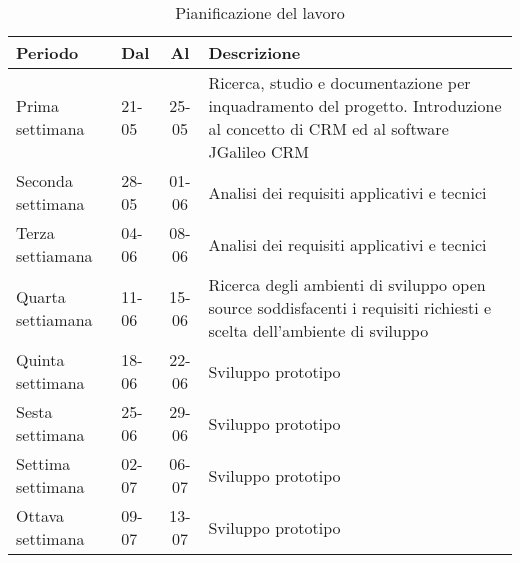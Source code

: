 \begin{table}[h]
\centering
\caption{Pianificazione del lavoro}
\label{tab:pianificazione-del-lavoro}
\begin{tabular}{|l|l|c|p{7cm}|}
\hline
Periodo  & Dal & Al &Descrizione\\
\hline
Prima settimana  & 21-05 & 25-05 & Ricerca, studio e documentazione per inquadramento del
progetto.
Introduzione al concetto di CRM ed al software JGalileo CRM\\
\hline
Seconda settimana  & 28-05 & 01-06 & Analisi dei requisiti applicativi e tecnici\\
\hline
Terza settiamana & 04-06 & 08-06 &Analisi dei requisiti applicativi e tecnici\\
\hline
Quarta settiamana  & 11-06 & 15-06 & Ricerca degli ambienti di sviluppo open source soddisfacenti i requisiti richiesti e scelta dell’ambiente di sviluppo\\
\hline
Quinta settimana  & 18-06 & 22-06 & Sviluppo prototipo\\
\hline
Sesta settimana  & 25-06 & 29-06 & Sviluppo prototipo\\
\hline
Settima settimana  & 02-07 & 06-07 &Sviluppo prototipo\\
\hline
Ottava settimana  & 09-07 & 13-07 &Sviluppo prototipo\\
\hline
\end{tabular}
\end{table}

\newpage